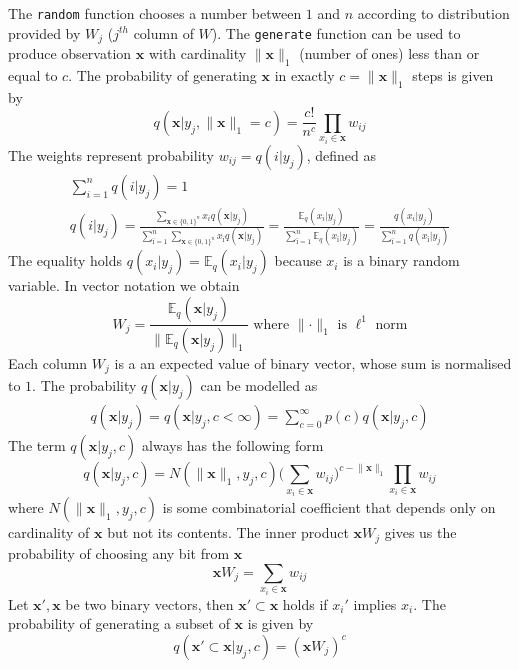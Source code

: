 \documentclass[12pt]{article}
\begin{document}
The \texttt{random} function chooses a number between $1$ and $n$ according to distribution provided by $W_j$ ($j^{th}$ column of $W$). The \texttt{generate} function can be used to produce observation $\boldsymbol{x}$ with cardinality $\lVert\boldsymbol{x} \rVert_1$ (number of ones) less than or equal to $c$.  The probability of generating $\boldsymbol{x}$ in exactly $c=\lVert\boldsymbol{x} \rVert_1$ steps is given by 
 \[
 q(\boldsymbol{x}|y_j, \lVert\boldsymbol{x} \rVert_1 = c) = \frac{c!}{n^c}\prod_{x_i\in\boldsymbol{x}} w_{ij}
 \]
The weights represent probability $w_{ij} = q(i| y_j)$, defined as
\begin{gather*}
\sum_{i=1}^{n} q(i | y_j) = 1 \\
q(i | y_j) =
\frac{\sum_{\boldsymbol{x}\in\{0,1\}^n}x_i  q(\boldsymbol{x}|y_j) }{\sum_{ï=1}^{n} \sum_{\boldsymbol{x}\in\{0,1\}^n}    x_{ï}  q(\boldsymbol{x}|y_j) } = \frac{\mathbb{E}_q(x_i|y_j)}{\sum_{ï=1}^{n} \mathbb{E}_q(x_{ï}|y_j)} =  \frac{q(x_i|y_j)}{\sum_{ï=1}^{n} q(x_{ï}|y_j)} 
\end{gather*}
The equality holds $q(x_i|y_j)=\mathbb{E}_q(x_i|y_j)$ because $x_i$ is a binary random variable. In vector notation we obtain
\[
W_j = \frac{\mathbb{E}_q(\boldsymbol{x}|y_j)}{\lVert \mathbb{E}_q(\boldsymbol{x}|y_j) \rVert _1}\text{ where }\lVert \cdot \rVert _1\text{ is }\ell^1\text{ norm}
\]
Each column $W_j$ is a an expected value of binary vector, whose sum is normalised to $1$. The probability $q(\boldsymbol{x}|y_j)$ can be modelled as
 \begin{gather*} 
q(\boldsymbol{x}|y_j) = q(\boldsymbol{x}|y_j,c<\infty) = \sum_{c=0}^{\infty} p(c) q(\boldsymbol{x}|y_j,c)
 \end{gather*}
The term $q(\boldsymbol{x}|y_j,c)$ always has the following form
\[
q(\boldsymbol{x}|y_j,c) = N(\lVert\boldsymbol{x} \rVert_1 ,y_j,c)\big(\sum_{x_i\in\boldsymbol{x}} w_{ij}\big)^{ c - \lVert\boldsymbol{x} \rVert_1  }\prod_{x_i\in\boldsymbol{x}} w_{ij}
\]
where $N(\lVert\boldsymbol{x} \rVert_1 ,y_j,c)$ is some combinatorial coefficient that depends only on cardinality of $\boldsymbol{x}$ but not its contents. The inner product  $\boldsymbol{x}W_j$ gives us the probability of choosing any bit from $\boldsymbol{x}$
\[
\boldsymbol{x}W_j = \sum_{x_i\in\boldsymbol{x}} w_{ij}
\]
Let $\boldsymbol{x}', \boldsymbol{x}$ be two binary vectors, then $\boldsymbol{x}' \subset \boldsymbol{x}$ holds if $x_i'$ implies $x_i$. The probability of generating a subset of $\boldsymbol{x}$ is given by
\[
q(\boldsymbol{x}' \subset \boldsymbol{x}|y_j,c) = (\boldsymbol{x}W_j)^c
\]
\end{document}
